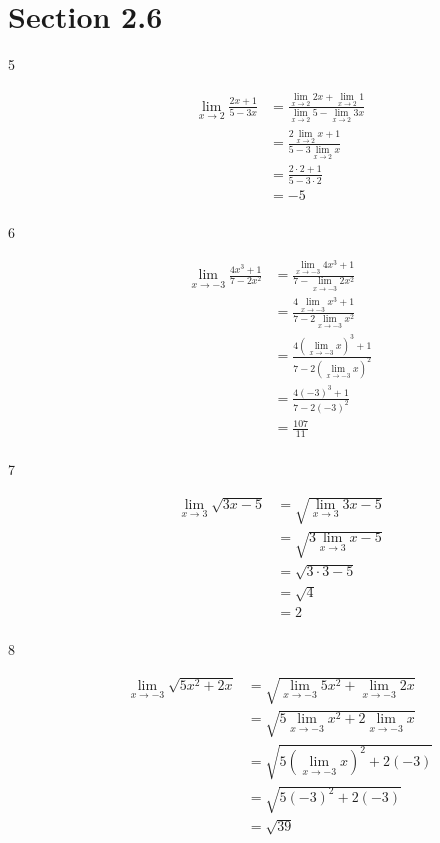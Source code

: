 \documentclass{exam}
\begin{document}
\section{Section 2.6}
\begin{description}

\item[5]
\begin{align*}
  \lim_{x \to 2} \frac{2x + 1}{5 - 3x} &= \frac{\lim\limits_{x \to 2} 2x + \lim\limits_{x \to 2} 1}{\lim\limits_{x \to 2} 5 - \lim\limits_{x \to 2} 3x} \\
  &= \frac{2 \lim\limits_{x \to 2} x + 1}{5 - 3 \lim\limits_{x \to 2} x} \\
  &= \frac{2 \cdot 2 + 1}{5 - 3 \cdot 2} \\
  &= -5 \\
\end{align*}

\item[6]
\begin{align*}
  \lim_{x \to -3} \frac{4x^3 + 1}{7-2x^2} &= \frac{\lim\limits_{x \to -3} 4x^3 + 1}{7- \lim\limits_{x \to -3} 2x^2} \\
   &= \frac{4 \lim\limits_{x \to -3} x^3 + 1}{7- 2 \lim\limits_{x \to -3} x^2} \\
   &= \frac{4 \left( \lim\limits_{x \to -3} x \right) ^3 + 1}{7- 2 \left( \lim\limits_{x \to -3} x \right)^2} \\
   &= \frac{4 (-3)^3 + 1}{7- 2 (-3)^2} \\
   &= \frac{107}{11} \\
\end{align*}

\item[7]
\begin{align*}
  \lim_{x \to 3} \sqrt{3x - 5} &= \sqrt{\lim_{x \to 3} 3x - 5} \\
  &= \sqrt{3 \lim_{x \to 3} x - 5} \\
  &= \sqrt{3 \cdot 3 - 5} \\
  &= \sqrt{4} \\
  &= 2 \\
\end{align*}

\item[8]
\begin{align*}
  \lim_{x \to -3} \sqrt{5x^2 + 2x} &= \sqrt{\lim_{x \to -3} 5x^2 + \lim_{x \to -3} 2x} \\
   &= \sqrt{5 \lim_{x \to -3} x^2 + 2 \lim_{x \to -3} x} \\
   &= \sqrt{5 \left( \lim_{x \to -3} x \right)^2 + 2 (-3)} \\
   &= \sqrt{5 (-3)^2 + 2 (-3)} \\
   &= \sqrt{39} \\
\end{align*}


\end{description}
\end{document}
